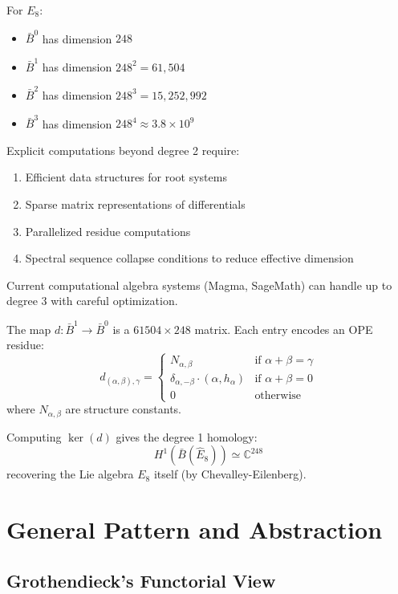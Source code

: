 \begin{remark}
For $E_8$:
\begin{itemize}
\item $\bar{B}^0$ has dimension $248$
\item $\bar{B}^1$ has dimension $248^2 = 61,504$
\item $\bar{B}^2$ has dimension $248^3 = 15,252,992$
\item $\bar{B}^3$ has dimension $248^4 \approx 3.8 \times 10^9$
\end{itemize}

Explicit computations beyond degree 2 require:
\begin{enumerate}
\item Efficient data structures for root systems
\item Sparse matrix representations of differentials
\item Parallelized residue computations
\item Spectral sequence collapse conditions to reduce effective dimension
\end{enumerate}

Current computational algebra systems (Magma, SageMath) can handle up to degree 3 with careful optimization.
\end{remark}

\begin{example}
The map $d: \bar{B}^1 \to \bar{B}^0$ is a $61504 \times 248$ matrix. Each entry encodes an OPE residue:
$$d_{(\alpha,\beta),\gamma} = \begin{cases}
N_{\alpha,\beta} & \text{if } \alpha+\beta = \gamma \\
\delta_{\alpha,-\beta} \cdot (\alpha, h_\alpha) & \text{if } \alpha + \beta = 0 \\
0 & \text{otherwise}
\end{cases}$$
where $N_{\alpha,\beta}$ are structure constants.

Computing $\ker(d)$ gives the degree 1 homology:
$$H^1(\bar{B}(\widehat{E}_8)) \simeq \mathbb{C}^{248}$$
recovering the Lie algebra $E_8$ itself (by Chevalley-Eilenberg).
\end{example}

\section{General Pattern and Abstraction}

\subsection{Grothendieck's Functorial View}

